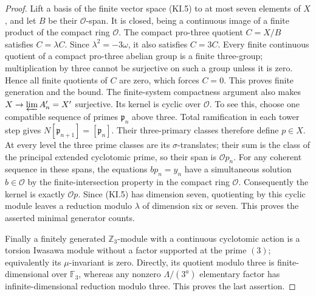 \begin{proof}
Lift a basis of the finite vector space (KI.5) to at most
seven elements of $X$, and let $B$ be their $\mathcal O$-span.
It is closed, being a continuous image of a finite product
of the compact ring $\mathcal O$.  The compact pro-three
quotient $C=X/B$ satisfies $C=\lambda C$.  Since
$\lambda^2=-3\omega$, it also satisfies $C=3C$.
Every finite continuous quotient of a compact pro-three
abelian group is a finite three-group; multiplication by
three cannot be surjective on such a group unless it is
zero.  Hence all finite quotients of $C$ are zero, which
forces $C=0$.  This proves finite generation and the bound.
The finite-system compactness argument also makes
$X\to\varprojlim A'_n=X'$ surjective.  Its kernel is
cyclic over $\mathcal O$.  To see this, choose one compatible
sequence of primes $\mathfrak p_n$ above three.  Total
ramification in each tower step gives
$N[\mathfrak p_{n+1}]=[\mathfrak p_n]$.  Their three-primary
classes therefore define $p\in X$.  At every level the
three prime classes are its $\sigma$-translates; their sum
is the class of the principal extended cyclotomic prime,
so their span is $\mathcal O p_n$.  For any coherent sequence
in these spans, the equations $b p_n=y_n$ have a simultaneous
solution $b\in\mathcal O$ by the finite-intersection property
in the compact ring $\mathcal O$.  Consequently the kernel
is exactly $\mathcal O p$.  Since (KI.5) has dimension seven,
quotienting by this cyclic module leaves a reduction modulo
$\lambda$ of dimension six or seven.  This proves the
asserted minimal generator counts.

Finally a finitely generated $\mathbb Z_3$-module with a
continuous cyclotomic action is a torsion Iwasawa module
without a factor supported at the prime $(3)$; equivalently
its $\mu$-invariant is zero.  Directly, its quotient modulo
three is finite-dimensional over $\mathbb F_3$, whereas any
nonzero $\Lambda/(3^a)$ elementary factor has infinite-dimensional
reduction modulo three.  This proves the last assertion.
\end{proof}

